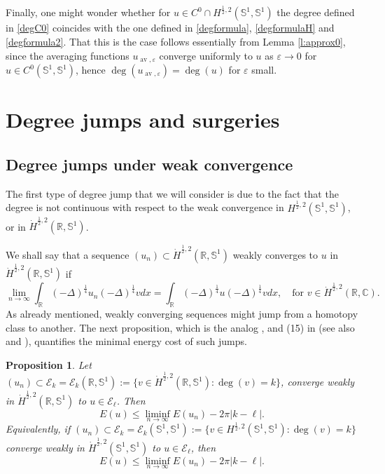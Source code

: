 \documentclass[12pt, a4paper]{article}
\newtheorem{prop}[thm]{Proposition}
\newcommand{\sph}{\mathbb{S}}
\newcommand{\R}{\mathbb{R}}
\newcommand{\ve}{\varepsilon}
\renewcommand{\(}{\left(}
\renewcommand{\)}{\right)}
\DeclareMathOperator{\av}{av}
\begin{document}
Finally, one might wonder whether for $u\in C^0\cap H^{\frac{1}{2},2}(\sph^1,\sph^1)$ the degree defined in \eqref{degC0} coincides with the one defined in  \eqref{degformula}, \eqref{degformulaH} and \eqref{degformula2}. That this is the case follows essentially from Lemma \ref{l:approx0}, since the averaging functions $u_{\av, \ve}$ converge uniformly to $u$ as $\ve\to 0$ for $u\in C^0(\sph^1,\sph^1)$, hence $\deg(u_{\av, \ve})=\deg(u)$ for $\ve$ small.

\section{Degree jumps and surgeries}

\subsection{Degree jumps under weak convergence}

The first type of degree jump that we will consider is due to the fact that the degree is not continuous with respect to the weak convergence in $H^{\frac12,2}(\sph^1,\sph^1)$, or in $\dot H^{\frac12,2}(\R,\sph^1)$.


We shall say that a sequence $(u_n)\subset \dot  H^{\frac{1}{2},2}(\R,\sph^1)$ %
 weakly converges to $u$ in $\dot H^{\frac{1}{2},2}(\R,\sph^1)$ if
$$\lim_{n\to \infty}\int_{\R}(-\Delta)^\frac14 u_n  (-\Delta)^\frac14 v dx=\int_{\R}(-\Delta)^\frac14 u  (-\Delta)^\frac14 v dx,\quad \text{for } v\in \dot H^{\frac{1}{2},2}(\R,\mathbb{C}).$$
As already mentioned, weakly converging sequences might jump from a homotopy class to another. The next proposition, which is the analog \cite[Lemma 3]{kuw},  and (15) in \cite{bc} (see also \cite{jost} and \cite[Lemma 1]{bc2}), quantifies the minimal energy cost of such jumps.

\begin{prop}\label{p:jump} Let $(u_n)\subset \mathcal{E}_k=\mathcal{E}_k(\R,\sph^1):=\{v\in \dot H^{\frac12,2}(\R,\sph^1):\deg(v)=k\}$, converge weakly in $\dot H^{\frac{1}{2},2}(\R,\sph^1)$ to $u\in \mathcal{E}_{\ell}$. Then $$E(u)\le \liminf_{n\to\infty} E(u_n)-2\pi |k-\ell|.$$
Equivalently, if $(u_n)\subset \mathcal{E}_k=\mathcal{E}_k(\sph^1,\sph^1):=\{v\in  H^{\frac12,2}(\sph^1,\sph^1):\deg(v)=k\}$ converge weakly in $\dot H^{\frac{1}{2},2}(\sph^1,\sph^1)$ to $u\in \mathcal{E}_{\ell}$, then $$E(u)\le \liminf_{n\to\infty} E(u_n)-2\pi |k-\ell|.$$ 
\end{prop}
\end{document}
